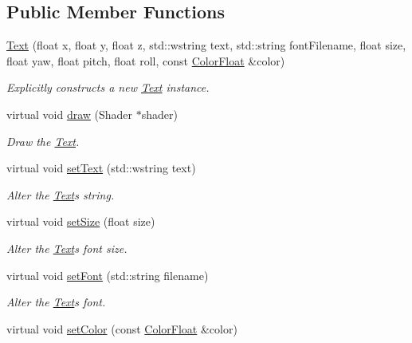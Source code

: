 \subsection*{Public Member Functions}
\begin{DoxyCompactItemize}
\item 
\hyperlink{classtsgl_1_1_text_a7c0ab1c94262edda688697561f155742}{Text} (float x, float y, float z, std\+::wstring text, std\+::string font\+Filename, float size, float yaw, float pitch, float roll, const \hyperlink{structtsgl_1_1_color_float}{Color\+Float} \&color)
\begin{DoxyCompactList}\small\item\em Explicitly constructs a new \hyperlink{classtsgl_1_1_text}{Text} instance. \end{DoxyCompactList}\item 
virtual void \hyperlink{classtsgl_1_1_text_ab2780341c59d000487759700c23bbf93}{draw} (Shader $\ast$shader)
\begin{DoxyCompactList}\small\item\em Draw the \hyperlink{classtsgl_1_1_text}{Text}. \end{DoxyCompactList}\item 
virtual void \hyperlink{classtsgl_1_1_text_a16a95a57b45b6a95ad9962cf6aa63027}{set\+Text} (std\+::wstring text)
\begin{DoxyCompactList}\small\item\em Alter the \hyperlink{classtsgl_1_1_text}{Text}\textquotesingle{}s string. \end{DoxyCompactList}\item 
virtual void \hyperlink{classtsgl_1_1_text_aa3d3e609a29d46c6914e44fd64d18993}{set\+Size} (float size)
\begin{DoxyCompactList}\small\item\em Alter the \hyperlink{classtsgl_1_1_text}{Text}\textquotesingle{}s font size. \end{DoxyCompactList}\item 
virtual void \hyperlink{classtsgl_1_1_text_a221951e84eae892f10d818cbae6e8084}{set\+Font} (std\+::string filename)
\begin{DoxyCompactList}\small\item\em Alter the \hyperlink{classtsgl_1_1_text}{Text}\textquotesingle{}s font. \end{DoxyCompactList}\item 
virtual void \hyperlink{classtsgl_1_1_text_a524c1aa3044dea3c7f20f9aa67d223de}{set\+Color} (const \hyperlink{structtsgl_1_1_color_float}{Color\+Float} \&color)

\end{DoxyCompactItemize}
